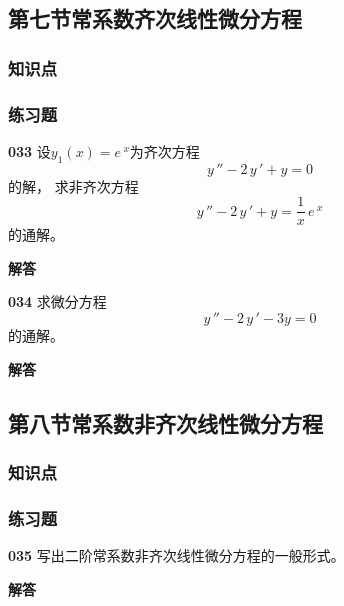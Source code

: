 \documentclass[a4paper,10pt]{article} %
\begin{document}


\textheight


\newpage
\subsection{第七节\quad 常系数齐次线性微分方程}
\subsubsection{知识点}
\subsubsection{练习题}
\par\noindent \textbf{033} \quad 设$y_1(x)=e\,^x$为齐次方程
$$y\,''-2\,y\,'+y=0$$
的解， 求非齐次方程
$$y\,''-2\,y\,'+y=\frac{1}{x}\,e\,^x$$
的通解。
\par\noindent \textbf{ 解答}





\textheight


\par\noindent \textbf{034} \quad 求微分方程
$$y\,''-2\,y\,'-3y=0$$
的通解。
\par\noindent \textbf{ 解答}





\textheight


\newpage
\subsection{第八节\quad 常系数非齐次线性微分方程}
\subsubsection{知识点}
\subsubsection{练习题}
\par\noindent \textbf{035} \quad 写出二阶常系数非齐次线性微分方程的一般形式。
\par\noindent \textbf{ 解答}
\end{document}
